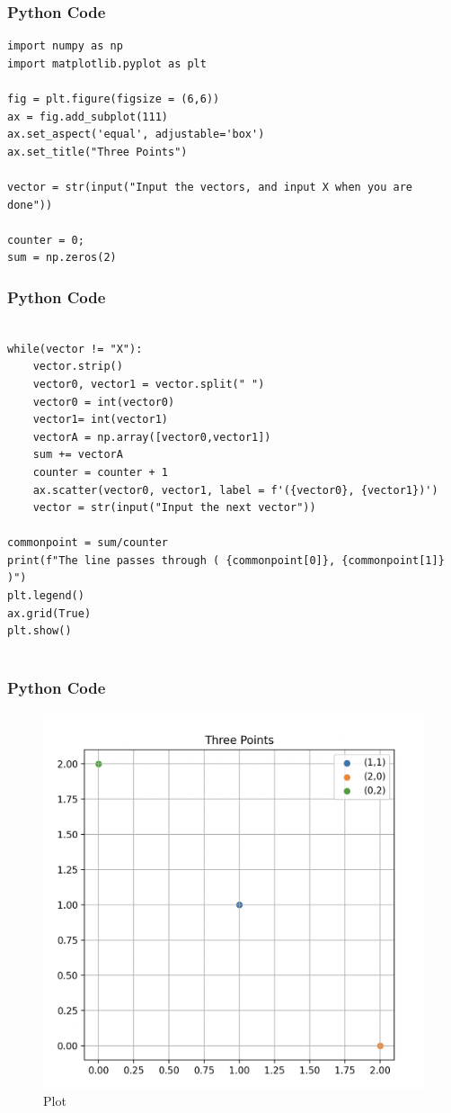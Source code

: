 \documentclass{beamer}
\begin{document}
\begin{frame}[fragile]
\frametitle{Python Code}
\begin{lstlisting}
import numpy as np
import matplotlib.pyplot as plt

fig = plt.figure(figsize = (6,6))
ax = fig.add_subplot(111)
ax.set_aspect('equal', adjustable='box')
ax.set_title("Three Points")

vector = str(input("Input the vectors, and input X when you are done"))

counter = 0;
sum = np.zeros(2)
\end{lstlisting}
\end{frame}
\begin{frame}[fragile]
\frametitle{Python Code}
\begin{lstlisting}

while(vector != "X"):
    vector.strip()
    vector0, vector1 = vector.split(" ")
    vector0 = int(vector0)
    vector1= int(vector1)
    vectorA = np.array([vector0,vector1])
    sum += vectorA
    counter = counter + 1
    ax.scatter(vector0, vector1, label = f'({vector0}, {vector1})')
    vector = str(input("Input the next vector"))
    
commonpoint = sum/counter
print(f"The line passes through ( {commonpoint[0]}, {commonpoint[1]} )")
plt.legend()
ax.grid(True)
plt.show()


\end{lstlisting}
\end{frame}

\begin{frame}[fragile]
\frametitle{Python Code}


\begin{figure}[H]
    \centering
    \includegraphics[width=0.7\columnwidth]{Figs/527.png}
    \caption{Plot}
    \label{fig:placeholder}
\end{figure} 

\end{frame}
\end{document}
